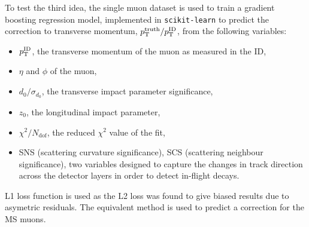 To test the third idea, the single muon dataset is used to train a
gradient boosting regression model, implemented in \texttt{scikit-learn}
\cite{scikit-learn} to predict the correction to transverse momentum,
$p_{\text{T}}^\text{truth}/p_{\text{T}}^\text{ID}$, from the following variables:
\begin{itemize}
\item $p_{\text{T}}^\text{ID}$, the transverse momentum of the muon as
measured in the ID,
\item $\eta$ and $\phi$ of the muon,
\item $d_0/\sigma_{d_0}$, the transverse impact parameter significance,
\item $z_0$, the longitudinal impact parameter,
\item $\chi^2/N_\text{dof}$, the reduced $\chi^2$ value of the fit,
\item SNS (scattering curvature significance), SCS (scattering
neighbour significance), two variables designed to capture the changes
in track direction across the detector layers in order to detect 
in-flight decays.
\end{itemize}
L1 loss function is used as the L2 loss was found to give biased
results due to asymetric residuals. The equivalent method is used
to predict a correction for the MS muons.

